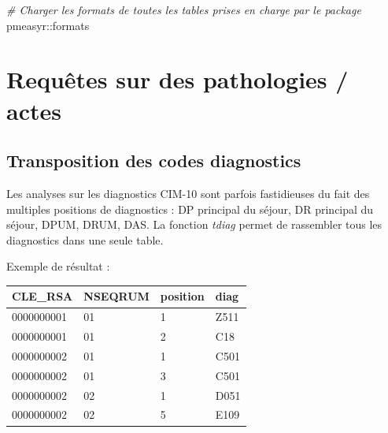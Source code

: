 \documentclass[]{book}
\newenvironment{Shaded}{\begin{snugshade}}{\end{snugshade}}
\newcommand{\KeywordTok}[1]{\textcolor[rgb]{0.13,0.29,0.53}{\textbf{{#1}}}}
\newcommand{\StringTok}[1]{\textcolor[rgb]{0.31,0.60,0.02}{{#1}}}
\newcommand{\CommentTok}[1]{\textcolor[rgb]{0.56,0.35,0.01}{\textit{{#1}}}}
\newcommand{\NormalTok}[1]{{#1}}
\begin{document}
\begin{Shaded}
\end{Shaded}

\begin{Shaded}
\begin{Highlighting}[]
\CommentTok{# Charger les formats de toutes les tables prises en charge par le package}
\NormalTok{pmeasyr::formats}
\end{Highlighting}
\end{Shaded}

\chapter{Requêtes sur des pathologies /
actes}\label{requetes-sur-des-pathologies-actes}

\section{Transposition des codes
diagnostics}\label{transposition-des-codes-diagnostics}

Les analyses sur les diagnostics CIM-10 sont parfois fastidieuses du
fait des multiples positions de diagnostics : DP principal du séjour, DR
principal du séjour, DPUM, DRUM, DAS. La fonction \emph{tdiag} permet de
rassembler tous les diagnostics dans une seule table.

\begin{Shaded}
\end{Shaded}

Exemple de résultat :

\begin{longtable}[]{@{}llll@{}}
\toprule
CLE\_RSA & NSEQRUM & position & diag\tabularnewline
\midrule
\endhead
0000000001 & 01 & 1 & Z511\tabularnewline
0000000001 & 01 & 2 & C18\tabularnewline
0000000002 & 01 & 1 & C501\tabularnewline
0000000002 & 01 & 3 & C501\tabularnewline
0000000002 & 02 & 1 & D051\tabularnewline
0000000002 & 02 & 5 & E109\tabularnewline
\bottomrule
\end{longtable}
\end{document}
